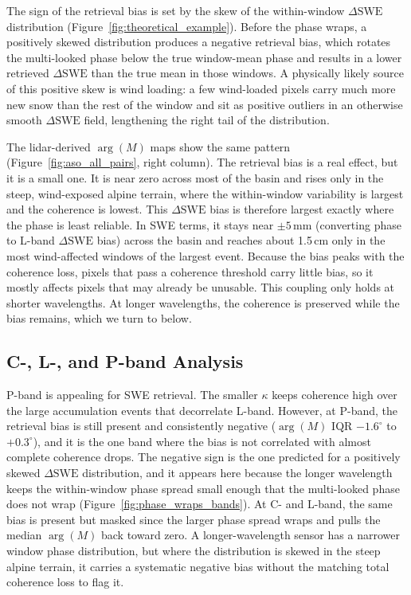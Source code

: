 \documentclass[tc, manuscript]{copernicus}
\begin{document}
The sign of the retrieval bias is set by the skew of the within-window $\Delta\mathrm{SWE}$ distribution (Figure~\ref{fig:theoretical_example}). Before the phase wraps, a positively skewed distribution produces a negative retrieval bias, which rotates the multi-looked phase below the true window-mean phase and results in a lower retrieved $\Delta\mathrm{SWE}$ than the true mean in those windows. A physically likely source of this positive skew is wind loading: a few wind-loaded pixels carry much more new snow than the rest of the window and sit as positive outliers in an otherwise smooth $\Delta\mathrm{SWE}$ field, lengthening the right tail of the distribution.

The lidar-derived $\arg(M)$ maps show the same pattern (Figure~\ref{fig:aso_all_pairs}, right column). The retrieval bias is a real effect, but it is a small one. It is near zero across most of the basin and rises only in the steep, wind-exposed alpine terrain, where the within-window variability is largest and the coherence is lowest. This $\Delta\mathrm{SWE}$ bias is therefore largest exactly where the phase is least reliable. In SWE terms, it stays near $\pm5$\,\unit{mm} (converting phase to L-band $\Delta\mathrm{SWE}$ bias) across the basin and reaches about 1.5\,\unit{cm} only in the most wind-affected windows of the largest event. Because the bias peaks with the coherence loss, pixels that pass a coherence threshold carry little bias, so it mostly affects pixels that may already be unusable. This coupling only holds at shorter wavelengths. At longer wavelengths, the coherence is preserved while the bias remains, which we turn to below.

\subsection{C-, L-, and P-band Analysis}\label{subsec:band-analysis}

P-band is appealing for SWE retrieval. The smaller $\kappa$ keeps coherence high over the large accumulation events that decorrelate L-band. However, at P-band, the retrieval bias is still present and consistently negative ($\arg(M)$ IQR $-1.6^\circ$ to $+0.3^\circ$), and it is the one band where the bias is not correlated with almost complete coherence drops. The negative sign is the one predicted for a positively skewed $\Delta\mathrm{SWE}$ distribution, and it appears here because the longer wavelength keeps the within-window phase spread small enough that the multi-looked phase does not wrap (Figure~\ref{fig:phase_wraps_bands}). At C- and L-band, the same bias is present but masked since the larger phase spread wraps and pulls the median $\arg(M)$ back toward zero. A longer-wavelength sensor has a narrower window phase distribution, but where the distribution is skewed in the steep alpine terrain, it carries a systematic negative bias without the matching total coherence loss to flag it.
\end{document}
